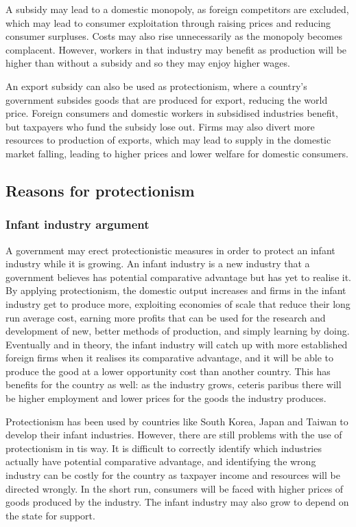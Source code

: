 \documentclass[Economics.tex]{subfiles}
\begin{document}
A subsidy may lead to a domestic monopoly, as foreign competitors are excluded, which may lead to consumer exploitation through raising prices and reducing consumer surpluses. Costs may also rise unnecessarily as the monopoly becomes complacent. However, workers in that industry may benefit as production will be higher than without a subsidy and so they may enjoy higher wages.

An export subsidy can also be used as protectionism, where a country's government subsides goods that are produced for export, reducing the world price. Foreign consumers and domestic workers in subsidised industries benefit, but taxpayers who fund the subsidy lose out. Firms may also divert more resources to production of exports, which may lead to supply in the domestic market falling, leading to higher prices and lower welfare for domestic consumers.
\subsection{Reasons for protectionism}
\subsubsection{Infant industry argument}
A government may erect protectionistic measures in order to protect an infant industry while it is growing. An infant industry is a new industry that a government believes has potential comparative advantage but has yet to realise it. By applying protectionism, the domestic output increases and firms in the infant industry get to produce more, exploiting economies of scale that reduce their long run average cost, earning more profits that can be used for the research and development of new, better methods of production, and simply learning by doing. Eventually and in theory, the infant industry will catch up with more established foreign firms when it realises its comparative advantage, and it will be able to produce the good at a lower opportunity cost than another country. This has benefits for the country as well: as the industry grows, ceteris paribus there will be higher employment and lower prices for the goods the industry produces.

Protectionism has been used by countries like South Korea, Japan and Taiwan to develop their infant industries. However, there are still problems with the use of protectionism in tis way. It is difficult to correctly identify which industries actually have potential comparative advantage, and identifying the wrong industry can be costly for the country as taxpayer income and resources will be directed wrongly. In the short run, consumers will be faced with higher prices of goods produced by the industry. The infant industry may also grow to depend on the state for support. 
\end{document}
